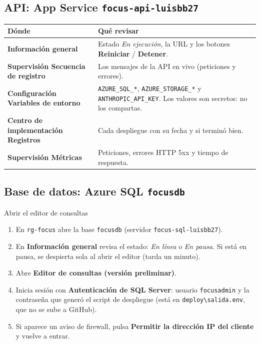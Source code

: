 \documentclass[11pt,a4paper]{article}
\newcommand{\menu}[1]{\textsf{\textbf{#1}}}
\begin{document}
\subsection{API: App Service \texttt{focus-api-luisbb27}}
\begin{center}
\renewcommand{\arraystretch}{1.2}
\begin{tabularx}{\textwidth}{>{\bfseries}l X}
\toprule
Dónde & Qué revisar \\
\midrule
Información general & Estado \emph{En ejecución}, la URL y los botones \menu{Reiniciar} / \menu{Detener}. \\
Supervisión \textrightarrow{} Secuencia de registro & Los mensajes de la API en vivo (peticiones y errores). \\
Configuración \textrightarrow{} Variables de entorno & \texttt{AZURE\_SQL\_*}, \texttt{AZURE\_STORAGE\_*} y \texttt{ANTHROPIC\_API\_KEY}. Los valores son secretos: no los compartas. \\
Centro de implementación \textrightarrow{} Registros & Cada despliegue con su fecha y si terminó bien. \\
Supervisión \textrightarrow{} Métricas & Peticiones, errores HTTP 5xx y tiempo de respuesta. \\
\bottomrule
\end{tabularx}
\end{center}

\subsection{Base de datos: Azure SQL \texttt{focusdb}}
\begin{paso}{Abrir el editor de consultas}
\begin{enumerate}[leftmargin=*]
  \item En \texttt{rg-focus} abre la base \texttt{focusdb} (servidor \texttt{focus-sql-luisbb27}).
  \item En \menu{Información general} revisa el estado: \emph{En línea} o \emph{En pausa}. Si está en pausa,
        se despierta sola al abrir el editor (tarda un minuto).
  \item Abre \menu{Editor de consultas (versión preliminar)}.
  \item Inicia sesión con \textbf{Autenticación de SQL Server}: usuario \texttt{focusadmin} y la contraseña
        que generó el script de despliegue (está en \texttt{deploy\textbackslash salida.env}, que no se sube a GitHub).
  \item Si aparece un aviso de firewall, pulsa \menu{Permitir la dirección IP del cliente} y vuelve a entrar.
\end{enumerate}
\end{paso}
\end{document}
